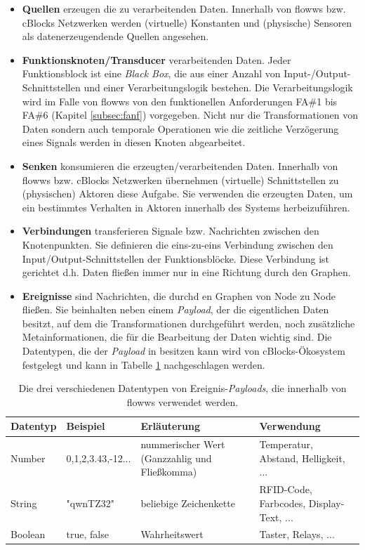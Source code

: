 \begin{itemize}
    \item \textbf{Quellen} erzeugen die zu verarbeitenden Daten. Innerhalb von flowws bzw. cBlocks Netzwerken werden (virtuelle) Konstanten und (physische) Sensoren als datenerzeugendende Quellen angesehen. 
    \item \textbf{Funktionsknoten/Transducer} verarbeitenden Daten. Jeder Funktionsblock ist eine \textit{Black Box}, die aus einer Anzahl von Input-/Output-Schnittstellen und einer Verarbeitungslogik bestehen. Die Verarbeitungslogik wird im Falle von flowws von den funktionellen Anforderungen FA\#1 bis FA\#6 (Kapitel \ref{subsec:fanf}) vorgegeben. Nicht nur die Transformationen von Daten sondern auch temporale Operationen wie die zeitliche Verzögerung eines Signals werden in diesen Knoten abgearbeitet. 
    \item \textbf{Senken} konsumieren die erzeugten/verarbeitenden Daten. Innerhalb von flowws bzw. cBlocks Netzwerken übernehmen (virtuelle) Schnittstellen zu (physischen) Aktoren diese Aufgabe. Sie verwenden die erzeugten Daten, um ein bestimmtes Verhalten in Aktoren innerhalb des Systems herbeizuführen.
    \item \textbf{Verbindungen} transferieren Signale bzw. Nachrichten zwischen den Knotenpunkten. Sie definieren die eins-zu-eins Verbindung zwischen den Input/Output-Schnittstellen der Funktionsblöcke. Diese Verbindung ist gerichtet d.h. Daten fließen immer nur in eine Richtung durch den Graphen.
    \item \textbf{Ereignisse} sind Nachrichten, die durchd en Graphen von Node zu Node fließen. Sie beinhalten neben einem \textit{Payload}, der die eigentlichen Daten besitzt, auf dem die Transformationen durchgeführt werden, noch zusätzliche Metainformationen, die für die Bearbeitung der Daten wichtig sind. Die Datentypen, die der \textit{Payload} in besitzen kann wird von cBlocks-Ökosystem festgelegt und kann in Tabelle \ref{tab:datentypenpayloads} nachgeschlagen werden.
\end{itemize}

 \begin{table}[h]
\caption{Die drei verschiedenen Datentypen von Ereignis-\textit{Payloads}, die innerhalb von flowws verwendet werden.}
\label{tab:datentypenpayloads}
\begin{tabularx}{\textwidth}{llXX}
\hline
\rowcolor[HTML]{EFEFEF} 
Datentyp & Beispiel &  Erläuterung &  Verwendung \\ \hline
Number & 0,1,2,3.43,-12...& nummerischer Wert (Ganzzahlig und Fließkomma) & Temperatur, Abstand, Helligkeit, ...   \\ \hline
String & "qwnTZ32" & beliebige Zeichenkette & RFID-Code, Farbcodes, Display-Text, ... \\ \hline
Boolean & true, false & Wahrheitswert & Taster, Relays, ... \\ \hline
\end{tabularx}
\end{table}

